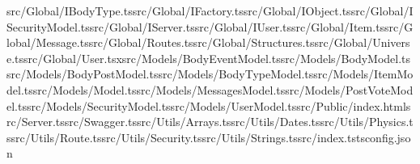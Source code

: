 \documentclass[a4paper,12pt]{article}
\begin{document}
src/Global/IBodyType.ts\newline src/Global/IFactory.ts\newline src/Global/IObject.ts\newline src/Global/ISecurityModel.ts\newline src/Global/IServer.ts\newline src/Global/IUser.ts\newline src/Global/Item.ts\newline src/Global/Message.ts\newline src/Global/Routes.ts\newline src/Global/Structures.ts\newline src/Global/Universe.ts\newline src/Global/User.tsx\newline src/Models/BodyEventModel.ts\newline src/Models/BodyModel.ts\newline src/Models/BodyPostModel.ts\newline src/Models/BodyTypeModel.ts\newline src/Models/ItemModel.ts\newline src/Models/Model.ts\newline src/Models/MessagesModel.ts\newline src/Models/PostVoteModel.ts\newline src/Models/SecurityModel.ts\newline src/Models/UserModel.ts\newline src/Public/index.html\newline src/Server.ts\newline src/Swagger.ts\newline src/Utils/Arrays.ts\newline src/Utils/Dates.ts\newline src/Utils/Physics.ts\newline src/Utils/Route.ts\newline src/Utils/Security.ts\newline src/Utils/Strings.ts\newline src/index.ts\newline tsconfig.json\newline


\end{document}
